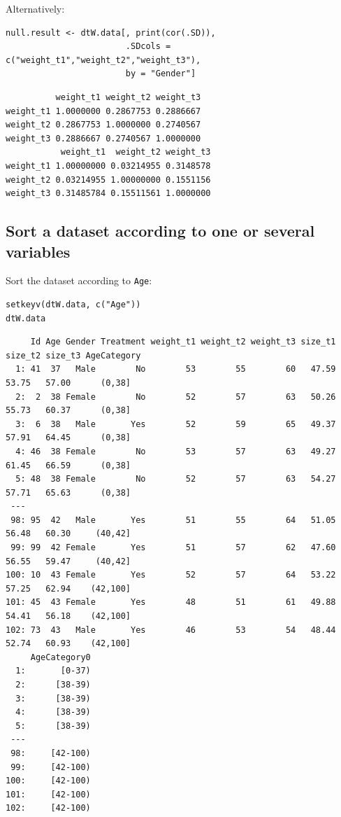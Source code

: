\documentclass{article}
\begin{document}
Alternatively:
\lstset{language=r,label= ,caption= ,captionpos=b,numbers=none}
\begin{lstlisting}
null.result <- dtW.data[, print(cor(.SD)), 
						.SDcols = c("weight_t1","weight_t2","weight_t3"), 
						by = "Gender"]
\end{lstlisting}

\begin{verbatim}
          weight_t1 weight_t2 weight_t3
weight_t1 1.0000000 0.2867753 0.2886667
weight_t2 0.2867753 1.0000000 0.2740567
weight_t3 0.2886667 0.2740567 1.0000000
           weight_t1  weight_t2 weight_t3
weight_t1 1.00000000 0.03214955 0.3148578
weight_t2 0.03214955 1.00000000 0.1551156
weight_t3 0.31485784 0.15511561 1.0000000
\end{verbatim}

\subsection{Sort a dataset according to one or several variables}
\label{sec:org465acca}

Sort the dataset according to \texttt{Age}:
\lstset{language=r,label= ,caption= ,captionpos=b,numbers=none}
\begin{lstlisting}
setkeyv(dtW.data, c("Age"))
dtW.data
\end{lstlisting}

\begin{verbatim}
     Id Age Gender Treatment weight_t1 weight_t2 weight_t3 size_t1 size_t2 size_t3 AgeCategory
  1: 41  37   Male        No        53        55        60   47.59   53.75   57.00      (0,38]
  2:  2  38 Female        No        52        57        63   50.26   55.73   60.37      (0,38]
  3:  6  38   Male       Yes        52        59        65   49.37   57.91   64.45      (0,38]
  4: 46  38 Female        No        53        57        63   49.27   61.45   66.59      (0,38]
  5: 48  38 Female        No        52        57        63   54.27   57.71   65.63      (0,38]
 ---                                                                                          
 98: 95  42   Male       Yes        51        55        64   51.05   56.48   60.30     (40,42]
 99: 99  42 Female       Yes        51        57        62   47.60   56.55   59.47     (40,42]
100: 10  43 Female       Yes        52        57        64   53.22   57.25   62.94    (42,100]
101: 45  43 Female       Yes        48        51        61   49.88   54.41   56.18    (42,100]
102: 73  43   Male       Yes        46        53        54   48.44   52.74   60.93    (42,100]
     AgeCategory0
  1:       [0-37)
  2:      [38-39)
  3:      [38-39)
  4:      [38-39)
  5:      [38-39)
 ---             
 98:     [42-100)
 99:     [42-100)
100:     [42-100)
101:     [42-100)
102:     [42-100)
\end{verbatim}
\end{document}
